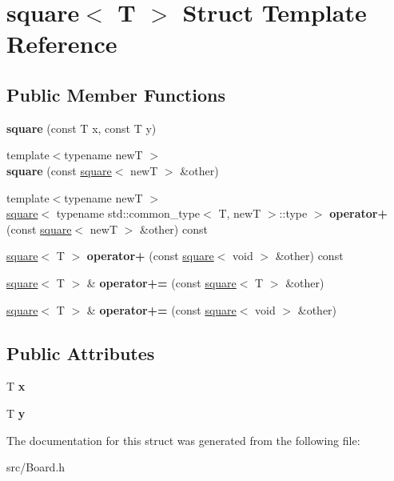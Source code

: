 \hypertarget{structsquare}{}\section{square$<$ T $>$ Struct Template Reference}
\label{structsquare}
\subsection*{Public Member Functions}
\begin{DoxyCompactItemize}
\item 
\mbox{\label{structsquare_a447dd893d605937230bba2861322df6d}} 
{\bfseries square} (const T x, const T y)
\item 
\mbox{\label{structsquare_a3ae63c51c5ae7e6416d94febdfabdba1}} 
{\footnotesize template$<$typename newT $>$ }\\{\bfseries square} (const \hyperlink{structsquare}{square}$<$ newT $>$ \&other)
\item 
\mbox{\label{structsquare_a1379df16b796073695499c59164634a7}} 
{\footnotesize template$<$typename newT $>$ }\\\hyperlink{structsquare}{square}$<$ typename std\+::common\+\_\+type$<$ T, newT $>$\+::type $>$ {\bfseries operator+} (const \hyperlink{structsquare}{square}$<$ newT $>$ \&other) const
\item 
\mbox{\label{structsquare_a97346a468c39963d3c30ba2649bd10b8}} 
\hyperlink{structsquare}{square}$<$ T $>$ {\bfseries operator+} (const \hyperlink{structsquare}{square}$<$ void $>$ \&other) const
\item 
\mbox{\label{structsquare_a449426e468a40af9fbc7a06128553ba1}} 
\hyperlink{structsquare}{square}$<$ T $>$ \& {\bfseries operator+=} (const \hyperlink{structsquare}{square}$<$ T $>$ \&other)
\item 
\mbox{\label{structsquare_acbf660ad49decf4178fbf843a7912251}} 
\hyperlink{structsquare}{square}$<$ T $>$ \& {\bfseries operator+=} (const \hyperlink{structsquare}{square}$<$ void $>$ \&other)
\end{DoxyCompactItemize}
\subsection*{Public Attributes}
\begin{DoxyCompactItemize}
\item 
\mbox{\label{structsquare_a9a6e49424fdfad5fe4ce893bb57ba467}} 
T {\bfseries x}
\item 
\mbox{\label{structsquare_a7b976f9389a2fc271a332b5014dfd1e9}} 
T {\bfseries y}
\end{DoxyCompactItemize}


The documentation for this struct was generated from the following file\+:\begin{DoxyCompactItemize}
\item 
src/Board.\+h\end{DoxyCompactItemize}

